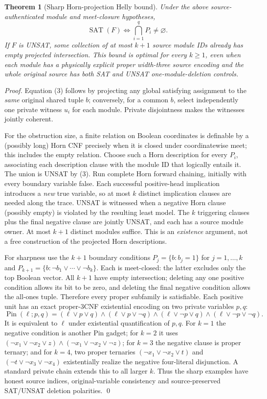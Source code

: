 \documentclass[11pt]{article}
\newtheorem{theorem}{Theorem}
\newcommand{\SAT}{\operatorname{SAT}}
\begin{document}
\begin{theorem}[Sharp Horn-projection Helly bound]\label{th:helly}
Under the above source-authenticated module and meet-closure hypotheses,
\[
 \SAT(F)\iff\bigcap_{i=1}^{q}P_i\ne\varnothing.              \tag{3}
\]
If $F$ is UNSAT, some collection of at most $k+1$ source module IDs
already has empty projected intersection. This bound is optimal for
every $k\ge1$, even when each module has a physically explicit proper
width-three source encoding and the whole original source has both
SAT and UNSAT one-module-deletion controls.
\end{theorem}
\begin{proof}
Equation (3) follows by projecting any global satisfying assignment to
the \emph{same} original shared tuple $b$; conversely, for a common $b$,
select independently one private witness $u_i$ for each module. Private
disjointness makes the witnesses jointly coherent.

For the obstruction size, a finite relation on Boolean coordinates is
definable by a (possibly long) Horn CNF precisely when it is closed under
coordinatewise meet; this includes the empty relation. Choose such a
Horn description for every $P_i$, associating each description clause
with the module ID that logically entails it. The union is UNSAT by
(3). Run complete Horn forward chaining, initially with every boundary
variable false. Each successful positive-head implication introduces
a \emph{new} true variable, so at most $k$ distinct implication clauses
are needed along the trace. UNSAT is witnessed when a negative Horn
clause (possibly empty) is violated by the resulting least model.
The $k$ triggering clauses plus the final negative clause are jointly
UNSAT, and each has a source module owner. At most $k+1$ distinct
modules suffice. This is an \emph{existence} argument, not a free
construction of the projected Horn descriptions.

For sharpness use the $k+1$ boundary conditions
$P_j=\{b:b_j=1\}$ for $j=1,\ldots,k$ and
$P_{k+1}=\{b:\neg b_1\vee\cdots\vee\neg b_k\}$.
Each is meet-closed: the latter excludes only the top Boolean vector.
All $k+1$ have empty intersection; deleting any one positive condition
allows its bit to be zero, and deleting the final negative condition
allows the all-ones tuple. Therefore every proper subfamily is
satisfiable. Each positive unit has an exact proper-3CNF existential
encoding on two private variables $p,q$:
\[
 \operatorname{Pin}(\ell;p,q)=
 (\ell\vee p\vee q)\wedge(\ell\vee p\vee\neg q)
 \wedge(\ell\vee\neg p\vee q)\wedge(\ell\vee\neg p\vee\neg q).
\]
It is equivalent to $\ell$ under existential quantification of $p,q$.
For $k=1$ the negative condition is another Pin gadget; for $k=2$ it
uses $(\neg x_1\vee\neg x_2\vee z)\wedge
(\neg x_1\vee\neg x_2\vee\neg z)$; for $k=3$ the negative clause
is proper ternary; and for $k=4$, two proper ternaries
$(\neg x_1\vee\neg x_2\vee t)$ and
$(\neg t\vee\neg x_3\vee\neg x_4)$ existentially realize the
negative four-literal disjunction. A standard private chain extends
this to all larger $k$. Thus the sharp examples have honest
source indices, original-variable consistency and source-preserved
SAT/UNSAT deletion polarities. \qed
\end{proof}
\end{document}
